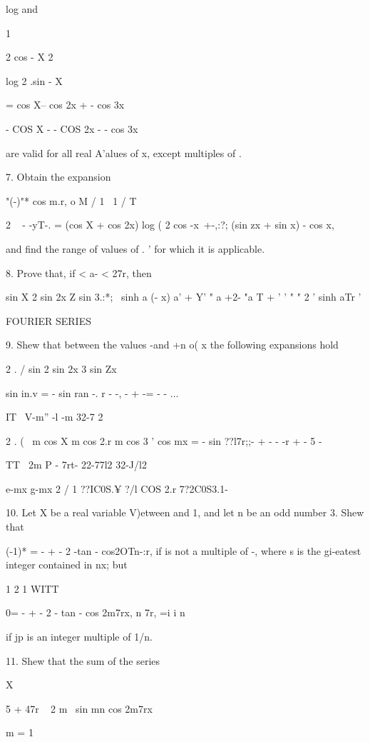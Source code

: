 log and

1

2 cos - X 2

log 2 .sin - X

= cos X-- cos 2x + - cos 3x

- COS X - - COS 2x - - cos 3x

are valid for all real A'alues of x, except multiples of \pi.

7. Obtain the expansion

"(-)"* cos m.r, o M / 1 \ 1 /  T  \

2 ~ - -yT-. = (cos X + cos 2x) log ( 2 cos -x\ +-,:?; (sin zx + sin x)
- cos x,

and find the range of values of . ' for which it is applicable.

8. Prove that, if < a- < 27r, then

sin X 2 sin 2x Z sin 3.:*; \ \pi sinh a (\pi - x) a' + Y' " a +2- "a T +
' ' " " 2 ' sinh aTr '


FOURIER SERIES

%
%

9. Shew that between the values -\pi and +n o( x the following
expansions hold

2 . / sin 2 sin 2x 3 sin Zx

sin in.v = - sin ran -. r - -, - + -= - - ...

IT \ V-m'' -l -m 32-7 2

2 . ( \ m cos X m cos 2.r m cos 3 ' cos mx = - sin ??l7r;;- + - - -r
+ - 5 -

TT \ 2m P - 7rt- 22-77l2 32-J/l2

e-mx g-mx 2 / 1 ??IC0S.¥ ?/l COS 2.r 7?2C0S3.1- \

10. Let X be a real variable V)etween and 1, and let n be an odd
number 3. Shew that

(-1)* = - + - 2 -tan - cos2OTn-:r, if is not a multiple of -, where s
is the gi-eatest integer contained in nx; but

 1 2 1 WITT

0= - + - 2 - tan - cos 2m7rx, n 7r, =i i n

if jp is an integer multiple of 1/n. 

11. Shew that the sum of the series

X

 5 + 47r ~ 2 m~ sin mn cos 2m7rx

m = 1


